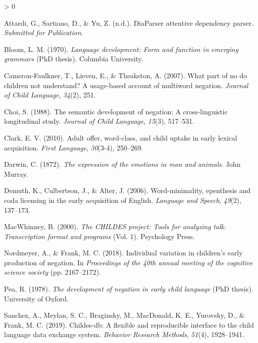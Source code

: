 \documentclass[
  english,
  man,floatsintext]{apa6}
\newlength{\cslhangindent}
\newenvironment{CSLReferences}[2] %
 {%
  \setlength{\parindent}{0pt}
  \ifodd #1 \everypar{\setlength{\hangindent}{\cslhangindent}}\ignorespaces\fi
  \ifnum #2 > 0
  \setlength{\parskip}{#2\baselineskip}
  \fi
 }%
 {}
\begin{document}
\endgroup

\hypertarget{refs}{}
\begin{CSLReferences}{1}{0}
\leavevmode\hypertarget{ref-diaparser}{}%
Attardi, G., Sartiano, D., \& Yu, Z. (n.d.). DiaParser attentive dependency parser. \emph{Submitted for Publication}.

\leavevmode\hypertarget{ref-bloom1970language}{}%
Bloom, L. M. (1970). \emph{Language development: Form and function in emerging grammars} (PhD thesis). Columbia University.

\leavevmode\hypertarget{ref-cameron2007part}{}%
Cameron-Faulkner, T., Lieven, E., \& Theakston, A. (2007). What part of no do children not understand? A usage-based account of multiword negation. \emph{Journal of Child Language}, \emph{34}(2), 251.

\leavevmode\hypertarget{ref-choi1988semantic}{}%
Choi, S. (1988). The semantic development of negation: A cross-linguistic longitudinal study. \emph{Journal of Child Language}, \emph{15}(3), 517--531.

\leavevmode\hypertarget{ref-clark2010adult}{}%
Clark, E. V. (2010). Adult offer, word-class, and child uptake in early lexical acquisition. \emph{First Language}, \emph{30}(3-4), 250--269.

\leavevmode\hypertarget{ref-darwin1872expression}{}%
Darwin, C. (1872). \emph{The expression of the emotions in man and animals}. John Murray.

\leavevmode\hypertarget{ref-demuth2006word}{}%
Demuth, K., Culbertson, J., \& Alter, J. (2006). Word-minimality, epenthesis and coda licensing in the early acquisition of {E}nglish. \emph{Language and Speech}, \emph{49}(2), 137--173.

\leavevmode\hypertarget{ref-macwhinney2000childes}{}%
MacWhinney, B. (2000). \emph{The CHILDES project: Tools for analyzing talk. Transcription format and programs} (Vol. 1). Psychology Press.

\leavevmode\hypertarget{ref-nordmeyer2018individual}{}%
Nordmeyer, A., \& Frank, M. C. (2018). Individual variation in children's early production of negation. In \emph{Proceedings of the 40th annual meeting of the cognitive science society} (pp. 2167--2172).

\leavevmode\hypertarget{ref-pea1978}{}%
Pea, R. (1978). \emph{The development of negation in early child language} (PhD thesis). University of Oxford.

\leavevmode\hypertarget{ref-sanchez2019childes}{}%
Sanchez, A., Meylan, S. C., Braginsky, M., MacDonald, K. E., Yurovsky, D., \& Frank, M. C. (2019). Childes-db: A flexible and reproducible interface to the child language data exchange system. \emph{Behavior Research Methods}, \emph{51}(4), 1928--1941.


\end{CSLReferences}
\end{document}
